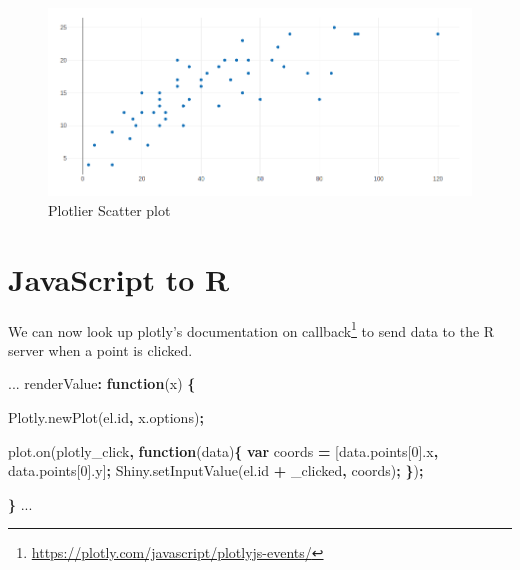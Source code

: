 \documentclass[
]{krantz}
\makeatletter
\newenvironment{Shaded}{\begin{snugshade}}{\end{snugshade}}
\newcommand{\AttributeTok}[1]{\textcolor[rgb]{0.61,0.61,0.61}{#1}}
\newcommand{\DecValTok}[1]{\textcolor[rgb]{0.06,0.06,0.06}{#1}}
\newcommand{\KeywordTok}[1]{\textcolor[rgb]{0.27,0.27,0.27}{\textbf{#1}}}
\newcommand{\NormalTok}[1]{#1}
\newcommand{\OperatorTok}[1]{\textcolor[rgb]{0.43,0.43,0.43}{\textbf{#1}}}
\newcommand{\StringTok}[1]{\textcolor[rgb]{0.5,0.5,0.5}{#1}}
\newcommand{\VariableTok}[1]{\textcolor[rgb]{0,0,0}{#1}}
\renewcommand{\href}[2]{#2\footnote{\url{#1}}}
\newenvironment{kframe}{%
\medskip{}
\setlength{\fboxsep}{.8em}
 \def\at@end@of@kframe{}%
 \ifinner\ifhmode%
  \def\at@end@of@kframe{\end{minipage}}%
  \begin{minipage}{\columnwidth}%
 \fi\fi%
 \def\FrameCommand##1{\hskip\@totalleftmargin \hskip-\fboxsep
 \colorbox{shadecolor}{##1}\hskip-\fboxsep
     \hskip-\linewidth \hskip-\@totalleftmargin \hskip\columnwidth}%
 \MakeFramed {\advance\hsize-\width
   \@totalleftmargin\z@ \linewidth\hsize
   \@setminipage}}%
 {\par\unskip\endMakeFramed%
 \at@end@of@kframe}
\renewenvironment{Shaded}{\begin{kframe}}{\end{kframe}}
\makeatother
\begin{document}
\begin{figure}
\centering
\includegraphics{images/plotlier-scatter.png}
\caption{Plotlier Scatter plot}
\end{figure}

\hypertarget{widgets-ex-plotly-js-to-r}{%
\section{JavaScript to R}\label{widgets-ex-plotly-js-to-r}}

We can now look up plotly's documentation on \href{https://plotly.com/javascript/plotlyjs-events/}{callback} to send data to the R server when a point is clicked.

\begin{Shaded}
\begin{Highlighting}[]
\NormalTok{...}
\NormalTok{renderValue}\OperatorTok{:} \KeywordTok{function}\NormalTok{(x) }\OperatorTok{\{}

  \VariableTok{Plotly}\NormalTok{.}\AttributeTok{newPlot}\NormalTok{(}\VariableTok{el}\NormalTok{.}\AttributeTok{id}\OperatorTok{,} \VariableTok{x}\NormalTok{.}\AttributeTok{options}\NormalTok{)}\OperatorTok{;}

  \VariableTok{plot}\NormalTok{.}\AttributeTok{on}\NormalTok{(}\StringTok{\textquotesingle{}plotly\_click\textquotesingle{}}\OperatorTok{,} \KeywordTok{function}\NormalTok{(data)}\OperatorTok{\{}
    \KeywordTok{var}\NormalTok{ coords }\OperatorTok{=}\NormalTok{ [}\VariableTok{data}\NormalTok{.}\AttributeTok{points}\NormalTok{[}\DecValTok{0}\NormalTok{].}\AttributeTok{x}\OperatorTok{,} \VariableTok{data}\NormalTok{.}\AttributeTok{points}\NormalTok{[}\DecValTok{0}\NormalTok{].}\AttributeTok{y}\NormalTok{]}\OperatorTok{;}
    \VariableTok{Shiny}\NormalTok{.}\AttributeTok{setInputValue}\NormalTok{(}\VariableTok{el}\NormalTok{.}\AttributeTok{id} \OperatorTok{+} \StringTok{\textquotesingle{}\_clicked\textquotesingle{}}\OperatorTok{,}\NormalTok{ coords)}\OperatorTok{;}
  \OperatorTok{\}}\NormalTok{)}\OperatorTok{;}

\OperatorTok{\}}
\NormalTok{...}
\end{Highlighting}
\end{Shaded}
\end{document}
